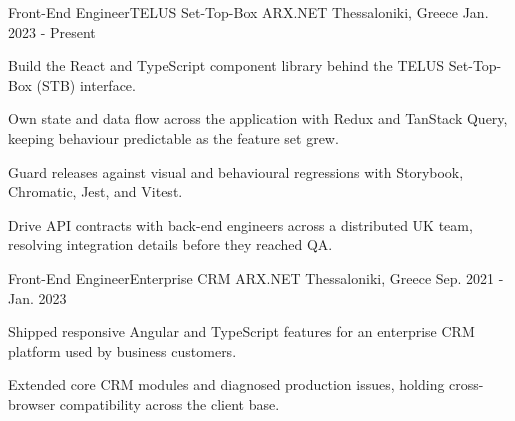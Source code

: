 

\begin{cventries}

  \cventry
    {Front-End Engineer{\enskip\cdotp\enskip}TELUS Set-Top-Box} %
    {ARX.NET} %
    {Thessaloniki, Greece} %
    {Jan. 2023 - Present} %
    {
      \begin{cvitems} %
        \item {Build the React and TypeScript component library behind the TELUS Set-Top-Box (STB) interface.}
        \item {Own state and data flow across the application with Redux and TanStack Query, keeping behaviour predictable as the feature set grew.}
        \item {Guard releases against visual and behavioural regressions with Storybook, Chromatic, Jest, and Vitest.}
        \item {Drive API contracts with back-end engineers across a distributed UK team, resolving integration details before they reached QA.}
      \end{cvitems}
    }

  \cventry
    {Front-End Engineer{\enskip\cdotp\enskip}Enterprise CRM} %
    {ARX.NET} %
    {Thessaloniki, Greece} %
    {Sep. 2021 - Jan. 2023} %
    {
      \begin{cvitems} %
        \item {Shipped responsive Angular and TypeScript features for an enterprise CRM platform used by business customers.}
        \item {Extended core CRM modules and diagnosed production issues, holding cross-browser compatibility across the client base.}
      \end{cvitems}
    }

\end{cventries}
